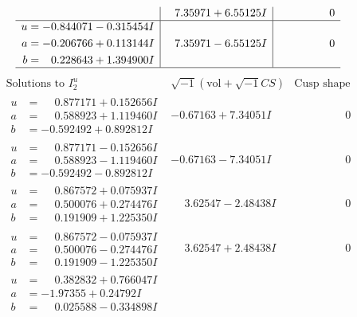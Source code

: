 \documentclass[1p]{elsarticle_modified}
\theoremstyle{definition}
\newcommand{\I}{\sqrt{-1}}
\begin{document}
$$\begin{array}{c|c|c}
 & \phantom{-}7.35971 + 6.55125 I & \phantom{-0.000000 } 0 \\ \hline\begin{aligned}
u &= -0.844071 - 0.315454 I \\
a &= -0.206766 + 0.113144 I \\
b &= \phantom{-}0.228643 + 1.394900 I\end{aligned}
 & \phantom{-}7.35971 - 6.55125 I & \phantom{-0.000000 } 0\\
 \hline 
 \end{array}$$\newpage$$\begin{array}{c|c|c}  
\text{Solutions to }I^u_{2}& \I (\text{vol} + \sqrt{-1}CS) & \text{Cusp shape}\\
 \hline 
\begin{aligned}
u &= \phantom{-}0.877171 + 0.152656 I \\
a &= \phantom{-}0.588923 + 1.119460 I \\
b &= -0.592492 + 0.892812 I\end{aligned}
 & -0.67163 + 7.34051 I & \phantom{-0.000000 } 0 \\ \hline\begin{aligned}
u &= \phantom{-}0.877171 - 0.152656 I \\
a &= \phantom{-}0.588923 - 1.119460 I \\
b &= -0.592492 - 0.892812 I\end{aligned}
 & -0.67163 - 7.34051 I & \phantom{-0.000000 } 0 \\ \hline\begin{aligned}
u &= \phantom{-}0.867572 + 0.075937 I \\
a &= \phantom{-}0.500076 + 0.274476 I \\
b &= \phantom{-}0.191909 + 1.225350 I\end{aligned}
 & \phantom{-}3.62547 - 2.48438 I & \phantom{-0.000000 } 0 \\ \hline\begin{aligned}
u &= \phantom{-}0.867572 - 0.075937 I \\
a &= \phantom{-}0.500076 - 0.274476 I \\
b &= \phantom{-}0.191909 - 1.225350 I\end{aligned}
 & \phantom{-}3.62547 + 2.48438 I & \phantom{-0.000000 } 0 \\ \hline\begin{aligned}
u &= \phantom{-}0.382832 + 0.766047 I \\
a &= -1.97355 + 0.24792 I \\
b &= \phantom{-}0.025588 - 0.334898 I\end{aligned}

\end{array}$$
\end{document}
